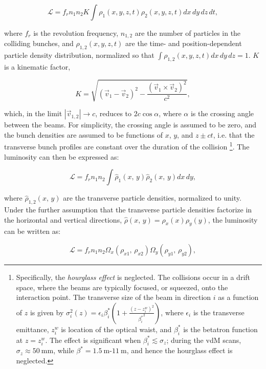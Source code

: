 \begin{equation}\label{eqn:luminosity-geometrical}
	\mathcal{L} = f_r n_1 n_2 K \int \rho_1(x,y,z,t) \rho_2(x,y,z,t) dx\,dy\,dz\,dt,
\end{equation}

where $f_r$ is the revolution frequency, $n_{1,2}$ are the number of particles in the colliding bunches, and $\rho_{1,2}(x,y,z,t)$ are the time- and position-dependent particle density distribution, normalized so that $\int \rho_{1,2}(x,y,z,t)dx\,dy\,dz = 1$. $K$ is a kinematic factor,

\begin{equation}
	K=\sqrt{(\vec{v}_1-\vec{v}_2)^2 - \frac{(\vec{v}_1\times\vec{v}_2)^2}{c^2}},
\end{equation}

which, in the limit $|\vec{v}_{1,2}|\rightarrow c$, reduces to $2c\cos\alpha$, where $\alpha$ is the crossing angle between the beams. For simplicity, the crossing angle is assumed to be zero, and the bunch densities are assumed to be functions of $x$, $y$, and $z\pm ct$, i.e. that the transverse bunch profiles are constant over the duration of the collision
\footnote{Specifically, the \emph{hourglass effect} is neglected. The collisions occur in a drift space, where the beams are typically focused, or squeezed, onto the interaction point. The transverse size of the beam in direction $i$ as a function of $z$ is given by $\sigma_{i}^2(z)=\epsilon_{i} \beta^*_{i} \left(1+\frac{(z-z_{i}^w)^2}{{\beta^*_{i}}^2}\right)$, where $\epsilon_{i}$ is the transverse emittance, $z_i^w$ is location of the optical waist, and $\beta^*_i$ is the betatron function at $z=z_i^w$. The effect is significant when $\beta^*_i\lesssim \sigma_z$; during the vdM scans, $\sigma_z\approx \SI{50}{\milli\meter}$, while $\beta^*=\SI{1.5}{\meter}$-$\SI{11}{\meter}$, and hence the hourglass effect is neglected.}. The luminosity can then be expressed as:

\begin{equation}
	\mathcal{L}=f_r n_1 n_2 \int \hat{\rho}_1(x,\,y)\hat{\rho}_2(x,\,y) dx\,dy,
\end{equation}

where $\hat{\rho}_{1,2}(x,\,y)$ are the transverse particle densities, normalized to unity. Under the further assumption that the transverse particle densities factorize in the horizontal and vertical directions, $\hat{\rho}(x,\,y)=\rho_x(x)\rho_y(y)$, the luminosity can be written as:

\begin{equation}
	\mathcal{L} = f_r n_1 n_2 \Omega_x(\rho_{x1},\,\rho_{x2}) \Omega_y(\rho_{y1},\,\rho_{y2}),
\end{equation}

